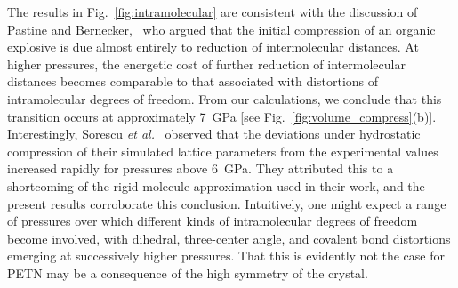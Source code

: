\documentclass[prb,aps,nobibnotes,twocolumn,doublespace,twocolumngrid,superbib]{revtex4}
\begin{document}
The results in Fig.~\ref{fig:intramolecular} are consistent with the
discussion of Pastine and Bernecker,~\cite{Pastine_1974v45} who argued
that the initial compression of an organic explosive is due almost
entirely to reduction of intermolecular distances.  At higher
pressures, the energetic cost of further reduction of intermolecular
distances becomes comparable to that associated with distortions of
intramolecular degrees of freedom.  From our calculations, we conclude
that this transition occurs at approximately 7~GPa [see
Fig.~\ref{fig:volume_compress}(b)].  Interestingly, Sorescu {\it et
al.}~\cite{Sorescu_1999v103} observed that the deviations under
hydrostatic compression of their simulated lattice parameters from the
experimental values increased rapidly for pressures above 6~GPa.  They
attributed this to a shortcoming of the rigid-molecule approximation
used in their work, and the present results corroborate this
conclusion.  Intuitively, one might expect a range of pressures over
which different kinds of intramolecular degrees of freedom become
involved, with dihedral, three-center angle, and covalent bond
distortions emerging at successively higher pressures.  That this is
evidently not the case for PETN may be a consequence of the high
symmetry of the crystal.
\end{document}
